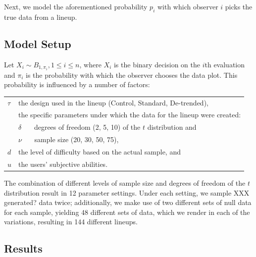 \documentclass{article}\usepackage[]{graphicx}\usepackage[]{color}
\newcommand{\al}[1]{{\color{red} #1}}
\newcommand{\alnote}[1]{\todo[inline,color=green!40]{#1}}
\begin{document}
Next, we model the aforementioned probability $p_i$ with which observer $i$ picks the true data from a lineup. 


\subsection{Model Setup}


Let $X_i \sim B_{1, \pi_i}, 1 \le i \le n$, where $X_i$ is the binary decision on the $i$th evaluation and $\pi_i$ is the probability with which the observer chooses the data plot. This probability is influenced by a number of factors:

\begin{center}
\begin{tabular}{lp{5in}}
$\tau$ & the design used in the lineup (Control, Standard, De-trended), \\
&  the specific parameters under which the data for the lineup were created: \\
&  $\delta$ \ \ \ degrees of freedom (2, 5, 10) {of the $t$ distribution} and \\
&  $\nu$  \ \ \ sample size (20, 30, 50, 75), \\
$d$ &  the level of difficulty based on the actual sample, and \\
$u$ & the users' subjective abilities.
 \end{tabular}
\end{center}
%

%
The combination of different levels of sample size and degrees of freedom of the $t$ distribution result in 12 parameter settings. Under each setting, we sample \al{XXX generated?} data twice; additionally, we make use of two different sets of null data for each sample, yielding 48 different sets of data, which we render in each of the variations, resulting in 144 different lineups. 

\subsection{Results}
\end{document}

